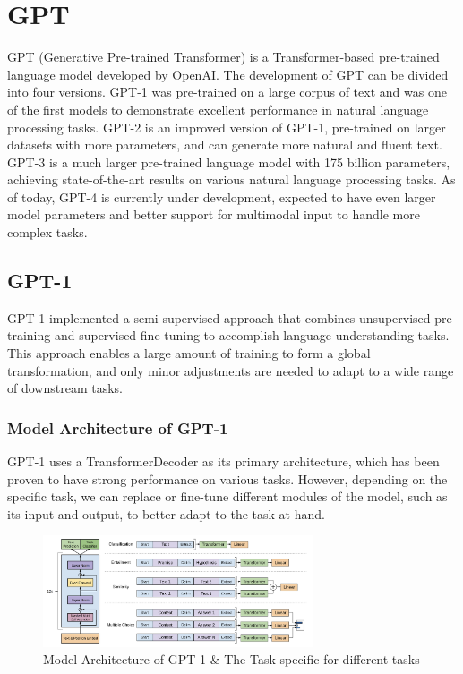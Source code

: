 \documentclass{IEEEtran}
\begin{document}
\section{GPT}

\par GPT (Generative Pre-trained Transformer) is a Transformer-based pre-trained language 
model developed by OpenAI. The development of GPT can be divided into four versions. 
GPT-1 was pre-trained on a large corpus of text and was one of the first models to 
demonstrate excellent performance in natural language processing tasks. GPT-2 is an 
improved version of GPT-1, pre-trained on larger datasets with more parameters, and 
can generate more natural and fluent text. GPT-3 is a much larger pre-trained language 
model with 175 billion parameters, achieving state-of-the-art results on various natural 
language processing tasks. As of today, GPT-4 is currently under development, expected 
to have even larger model parameters and better support for multimodal input to handle 
more complex tasks.

\subsection{GPT-1}

\par GPT-1 implemented a semi-supervised approach that combines unsupervised pre-training 
and supervised fine-tuning to accomplish language understanding tasks. This approach 
enables a large amount of training to form a global transformation, and only minor 
adjustments are needed to adapt to a wide range of downstream tasks.

\subsubsection{Model Architecture of GPT-1}

\par GPT-1 uses a TransformerDecoder as its primary architecture, 
which has been proven to have strong performance on various tasks. However, 
depending on the specific task, we can replace or fine-tune different modules 
of the model, such as its input and output, to better adapt to the task at hand.

\begin{figure}[htbp]
    \centerline{\includegraphics[width = 8cm]{pic/fig5.png}}
    \caption{Model Architecture of GPT-1 \& The Task-specific for different tasks}
    \label{fig}
\end{figure}
\end{document}
